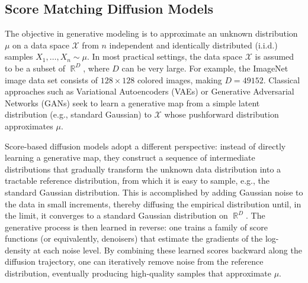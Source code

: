 \documentclass[12pts]{article}
\def\Real{\mathop{\mathbb{R}}\nolimits}
\newcommand{\sX}{ \mathscr{X}}
\begin{document}
\subsection{Score Matching Diffusion Models}
\label{sec_diff_intro}
The objective in generative modeling is to approximate an unknown distribution $\mu$ on a data space $\sX$ from $n$ independent and identically distributed (i.i.d.) samples ${X_1, \dots, X_n} \sim \mu$. In most practical settings, the data space $\sX$ is assumed to be a subset of $\Real^D$, where $D$ can be very large. For example, the ImageNet image data set consists of $128 \times 128$ colored images, making $D= 49152$. Classical approaches such as Variational Autoencoders (VAEs) \citep{kingma2014autoencoding} or Generative Adversarial Networks (GANs) \citep{goodfellow2020generative} seek to learn a generative map from a simple latent distribution (e.g., standard Gaussian) to $\sX$ whose pushforward distribution approximates $\mu$.

Score-based diffusion models \citep{ho2020denoising,songscore,song2019generative} adopt a different perspective: instead of directly learning a generative map, they construct a sequence of intermediate distributions that gradually transform the unknown data distribution into a tractable reference distribution, from which it is easy to sample, e.g., the standard Gaussian distribution. This is accomplished by adding Gaussian noise to the data in small increments, thereby diffusing the empirical distribution until, in the limit, it converges to a standard Gaussian distribution on $\Real^D$. The generative process is then learned in reverse: one trains a family of score functions (or equivalently, denoisers) that estimate the gradients of the log-density at each noise level. By combining these learned scores backward along the diffusion trajectory, one can iteratively remove noise from the reference distribution, eventually producing high-quality samples that approximate $\mu$. 
\end{document}
